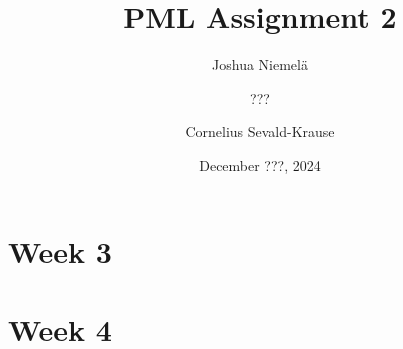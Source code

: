 \documentclass{article}
\begin{document}
\title{PML Assignment 2}
\author{
  Joshua Niemelä
  \and
  ???
  \and
  Cornelius Sevald-Krause
}
\date{December ???, 2024}
\maketitle

\section{Week 3}


\section{Week 4}

\end{document}
